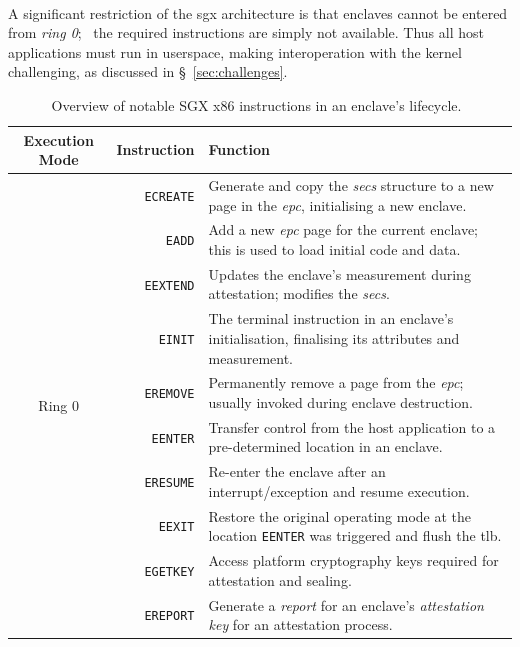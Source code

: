 \paragraph{} \label{sec:sgx-no-kernel-mode} A significant restriction of the \acrshort{sgx} architecture is that enclaves cannot be entered from \textit{ring 0};~\cite{sgx-prog-reference} the required instructions are simply not available. Thus all host applications must run in userspace, making interoperation with the kernel challenging, as discussed in §~\ref{sec:challenges}.

\begin{table}
    \centering
    \newcommand\tableTop{\rule{0pt}{3ex}}
    \newcommand\tableMid{\rule{0pt}{3ex}}
    \newcommand\tableBottom{\rule[-2ex]{0pt}{0pt}}
    \begin{tabular}{|c|r|p{8.5cm}|} 
        \hline
        Execution Mode & Instruction & Function \\ [0.1ex] 
        \hline\hline
        \multirow{11}{*}{Ring 0} 
            & \tableTop{\texttt{ECREATE}} & \tableTop{Generate and copy the \textit{\acrshort{secs}} structure to a new page in the \textit{\acrshort{epc}}, initialising a new enclave.} \\ 
            & \texttt{EADD} & \tableMid{Add a new \textit{\acrshort{epc}} page for the current enclave; this is used to load initial code and data.} \\ 
            & \texttt{EEXTEND} & \tableMid{Updates the enclave's measurement during attestation; modifies the \textit{\acrshort{secs}}.} \\ 
            & \texttt{EINIT} & \tableMid{The terminal instruction in an enclave's initialisation, finalising its attributes and measurement.} \\ 
            & \texttt{EREMOVE} & \tableMid{Permanently remove a page from the \textit{\acrshort{epc}}; usually invoked during enclave destruction.} \tableBottom \\ 
        \hline\hline
        \multirow{11}{*}{Ring 3} 
        & \tableTop{\texttt{EENTER}} & \tableTop{Transfer control from the host application to a pre-determined location in an enclave.} \\ 
        & \texttt{ERESUME} & \tableMid{Re-enter the enclave after an interrupt/exception and resume execution.} \\ 
        & \texttt{EEXIT} & \tableMid{Restore the original operating mode at the location \texttt{EENTER} was triggered and flush the \acrshort{tlb}.} \\ 
        & \texttt{EGETKEY} & \tableMid{Access platform cryptography keys required for attestation and sealing.} \\ 
        & \texttt{EREPORT} & \tableMid{Generate a \textit{report} for an enclave's \textit{attestation key} for an attestation process.} \tableBottom \\ 
        \hline
    \end{tabular}
    \vspace{5mm}
    \caption[Overview of notable SGX x86 instructions in an enclave's lifecycle.]{Overview of notable SGX x86 instructions in an enclave's lifecycle.~\cite{sgx-prog-reference}}
    \label{table:sgx-instructions}
\end{table}


